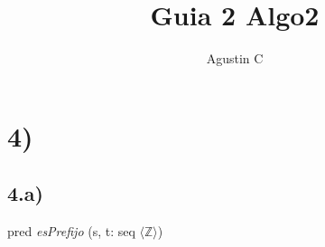 \documentclass{article}
\title{Guia 2 Algo2}
\author{Agustin C}
\newcommand{\italica}[1]{\textit{#1}}
\newcommand{\conjuntito}[1]{\langle #1 \rangle}
\newcommand{\enteros}[0]{\mathbb{Z}}
\begin{document}
\maketitle
\section*{4)}
\subsection*{4.a)}
pred \italica{esPrefijo} (s, t: seq  $ \conjuntito{\enteros}$) 
\end{document}

